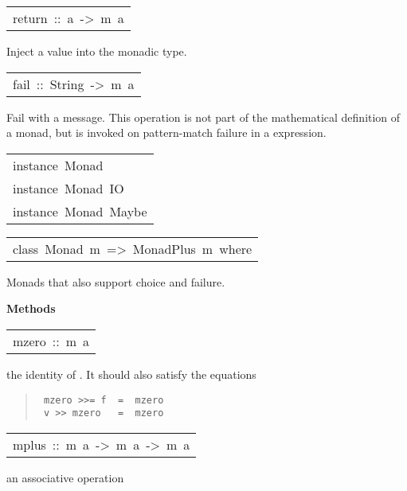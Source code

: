 \begin{haddockdesc}
\begin{haddockdesc}
\end{haddockdesc}
\begin{haddockdesc}
\item[\begin{tabular}{@{}l}
return\ ::\ a\ ->\ m\ a
\end{tabular}]\haddockbegindoc
Inject a value into the monadic type.
\par

\end{haddockdesc}
\begin{haddockdesc}
\item[\begin{tabular}{@{}l}
fail\ ::\ String\ ->\ m\ a
\end{tabular}]\haddockbegindoc
Fail with a message.  This operation is not part of the
 mathematical definition of a monad, but is invoked on pattern-match
 failure in a  expression.
\par

\end{haddockdesc}
\end{haddockdesc}
\begin{haddockdesc}
\item[\begin{tabular}{@{}l}
instance\ Monad\ {\char 91}{\char 93}\\instance\ Monad\ IO\\instance\ Monad\ Maybe
\end{tabular}]
\end{haddockdesc}
\begin{haddockdesc}
\item[\begin{tabular}{@{}l}
class\ Monad\ m\ =>\ MonadPlus\ m\ where
\end{tabular}]\haddockbegindoc
Monads that also support choice and failure.
\par

\haddockpremethods{}\textbf{Methods}
\begin{haddockdesc}
\item[\begin{tabular}{@{}l}
mzero\ ::\ m\ a
\end{tabular}]\haddockbegindoc
the identity of .  It should also satisfy the equations
\par
\begin{quote}
{\haddockverb\begin{verbatim}
 mzero >>= f  =  mzero
 v >> mzero   =  mzero
\end{verbatim}}
\end{quote}

\end{haddockdesc}
\begin{haddockdesc}
\item[\begin{tabular}{@{}l}
mplus\ ::\ m\ a\ ->\ m\ a\ ->\ m\ a
\end{tabular}]\haddockbegindoc
an associative operation
\par

\end{haddockdesc}
\end{haddockdesc}
